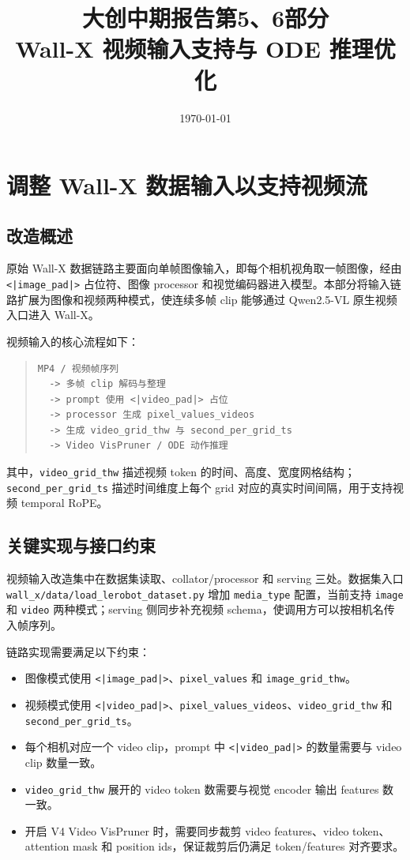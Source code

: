 \documentclass[UTF8,a4paper,12pt]{ctexart}
\title{大创中期报告第5、6部分\\Wall-X 视频输入支持与 ODE 推理优化}
\author{}
\date{\today}
\begin{document}
\maketitle
\tableofcontents
\newpage



\section{调整 Wall-X 数据输入以支持视频流}

\subsection{改造概述}

原始 Wall-X 数据链路主要面向单帧图像输入，即每个相机视角取一帧图像，经由
\texttt{<|image\_pad|>} 占位符、图像 processor 和视觉编码器进入模型。本部分将输入链路扩展为图像和视频两种模式，使连续多帧 clip 能够通过 Qwen2.5-VL 原生视频入口进入 Wall-X。

视频输入的核心流程如下：

\begin{quote}\small
\begin{verbatim}
MP4 / 视频帧序列
  -> 多帧 clip 解码与整理
  -> prompt 使用 <|video_pad|> 占位
  -> processor 生成 pixel_values_videos
  -> 生成 video_grid_thw 与 second_per_grid_ts
  -> Video VisPruner / ODE 动作推理
\end{verbatim}
\end{quote}

其中，\texttt{video\_grid\_thw} 描述视频 token 的时间、高度、宽度网格结构；\texttt{second\_per\_grid\_ts} 描述时间维度上每个 grid 对应的真实时间间隔，用于支持视频 temporal RoPE。

\subsection{关键实现与接口约束}

视频输入改造集中在数据集读取、collator/processor 和 serving 三处。数据集入口 \texttt{wall\_x/data/load\_lerobot\_dataset.py} 增加 \texttt{media\_type} 配置，当前支持 \texttt{image} 和 \texttt{video} 两种模式；serving 侧同步补充视频 schema，使调用方可以按相机名传入帧序列。

链路实现需要满足以下约束：

\begin{itemize}
  \item 图像模式使用 \texttt{<|image\_pad|>}、\texttt{pixel\_values} 和 \texttt{image\_grid\_thw}。
  \item 视频模式使用 \texttt{<|video\_pad|>}、\texttt{pixel\_values\_videos}、\texttt{video\_grid\_thw} 和 \texttt{second\_per\_grid\_ts}。
  \item 每个相机对应一个 video clip，prompt 中 \texttt{<|video\_pad|>} 的数量需要与 video clip 数量一致。
  \item \texttt{video\_grid\_thw} 展开的 video token 数需要与视觉 encoder 输出 features 数一致。
  \item 开启 V4 Video VisPruner 时，需要同步裁剪 video features、video token、attention mask 和 position ids，保证裁剪后仍满足 token/features 对齐要求。
\end{itemize}
\end{document}
